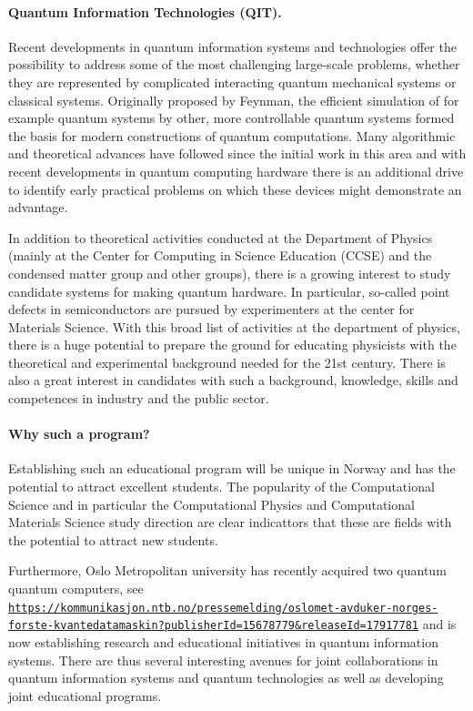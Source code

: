 \documentclass[%
oneside,                 %
final,                   %
10pt]{article}
\begin{document}
\noindent
\paragraph{Quantum Information Technologies (QIT).}
Recent developments in quantum information systems
and technologies offer the possibility to address some of the most
challenging large-scale problems, whether they are represented by
complicated interacting quantum mechanical systems or classical
systems.  Originally proposed by Feynman, the efficient simulation of
for example quantum systems by other, more controllable quantum
systems formed the basis for modern constructions of quantum
computations.  Many algorithmic and theoretical advances have followed
since the initial work in this area and with recent developments in
quantum computing hardware there is an additional drive to identify
early practical problems on which these devices might demonstrate an
advantage.

In addition to theoretical activities conducted at the
Department of Physics (mainly at the Center for Computing in Science
Education (CCSE) and the condensed matter group and other groups), there is a growing
interest to study candidate systems for making quantum hardware. In
particular, so-called point defects in semiconductors are pursued by
experimenters at the center for Materials Science.  With this broad
list of activities at the department of physics, there is a huge
potential to prepare the ground for educating physicists with the
theoretical and experimental background needed for the 21st
century. There is also a great interest in candidates with such a
background, knowledge, skills and competences in industry and the
public sector.

\paragraph{Why such a program?}
Establishing such an educational program will be unique in Norway and
has the potential to attract excellent students.  The popularity of
the Computational Science and in particular the Computational Physics
and Computational Materials Science study direction are clear
indicattors that these are fields with the potential to attract new
students.

Furthermore,
Oslo Metropolitan university  has recently acquired two quantum quantum computers, see \href{{https://kommunikasjon.ntb.no/pressemelding/oslomet-avduker-norges-forste-kvantedatamaskin?publisherId=15678779&releaseId=17917781}}{\nolinkurl{https://kommunikasjon.ntb.no/pressemelding/oslomet-avduker-norges-forste-kvantedatamaskin?publisherId=15678779&releaseId=17917781}} and is now establishing research and educational initiatives in quantum information systems. There are thus several interesting avenues for joint collaborations in quantum information systems and quantum technologies as well as developing joint educational programs.
\end{document}
